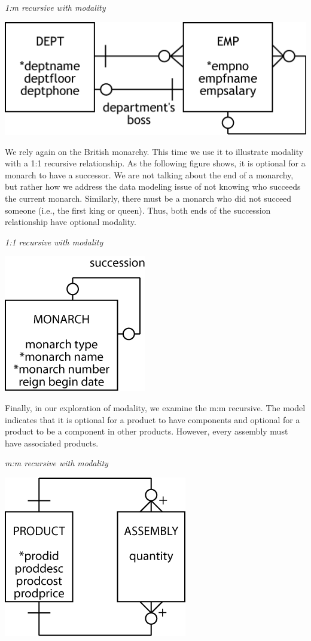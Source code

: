 \documentclass[
]{article}
\begin{document}
\emph{1:m recursive with modality}

\includegraphics{Figures/Chapter 7/rec-1-and-m-modality.png}

We rely again on the British monarchy. This time we use it to illustrate
modality with a 1:1 recursive relationship. As the following figure
shows, it is optional for a monarch to have a successor. We are not
talking about the end of a monarchy, but rather how we address the data
modeling issue of not knowing who succeeds the current monarch.
Similarly, there must be a monarch who did not succeed someone (i.e.,
the first king or queen). Thus, both ends of the succession relationship
have optional modality.

\emph{1:1 recursive with modality}

\includegraphics{Figures/Chapter 7/rec-1-and-1-modality.png}

Finally, in our exploration of modality, we examine the m:m recursive.
The model indicates that it is optional for a product to have components
and optional for a product to be a component in other products. However,
every assembly must have associated products.

\emph{m:m recursive with modality}

\includegraphics{Figures/Chapter 7/rec-m-and-m-modality.png}
\end{document}
